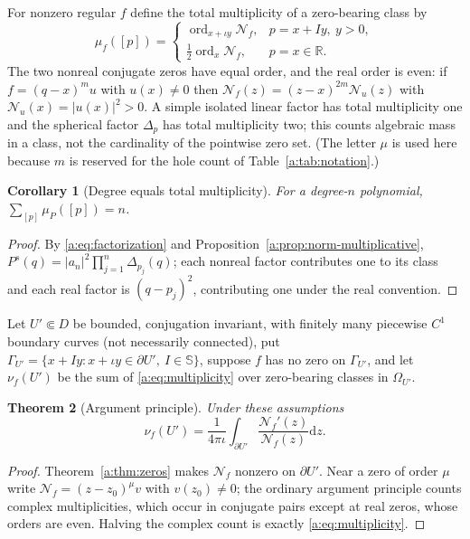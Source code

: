\documentclass[11pt,a4paper]{article}
\numberwithin{equation}{section}
\newtheorem{theorem}{Theorem}[section]
\newtheorem{corollary}[theorem]{Corollary}
\theoremstyle{definition}
\theoremstyle{remark}
\theoremstyle{plain}
\newcommand{\RR}{\mathbb R}
\newcommand{\SSS}{\mathbb S}
\newcommand{\Om}{\Omega}
\newcommand{\abs}[1]{\lvert #1\rvert}
\newcommand{\dd}{\mathrm d}
\begin{document}
For nonzero regular $f$ define the total multiplicity of a zero-bearing class
by
\begin{equation}
 \mu_f([p])=
 \begin{cases}
  \operatorname{ord}_{x+\iota y}\mathcal N_f,&p=x+Iy,\ y>0,\\[2pt]
  \tfrac12\operatorname{ord}_x\mathcal N_f,&p=x\in\RR .
 \end{cases}
 \label{a:eq:multiplicity}
\end{equation}
The two nonreal conjugate zeros have equal order, and the real order is even:
if $f=(q-x)^mu$ with $u(x)\ne0$ then
$\mathcal N_f(z)=(z-x)^{2m}\mathcal N_u(z)$ with
$\mathcal N_u(x)=\abs{u(x)}^2>0$. A simple isolated linear factor has total
multiplicity one and the spherical factor $\Delta_p$ has total multiplicity
two; this counts algebraic mass in a class, not the cardinality of the
pointwise zero set. (The letter $\mu$ is used here because $m$ is reserved
for the hole count of Table~\ref{a:tab:notation}.)

\begin{corollary}[Degree equals total multiplicity]
\label{a:cor:degreecount}
For a degree-$n$ polynomial, $\sum_{[p]}\mu_P([p])=n$.
\end{corollary}

\begin{proof}
By \eqref{a:eq:factorization} and Proposition~\ref{a:prop:norm-multiplicative},
$P^s(q)=\abs{a_n}^2\prod_{j=1}^n\Delta_{p_j}(q)$; each nonreal factor
contributes one to its class and each real factor is $(q-p_j)^2$, contributing
one under the real convention.
\end{proof}

Let $U'\Subset D$ be bounded, conjugation invariant, with finitely many
piecewise $C^1$ boundary curves (not necessarily connected), put
$\Gamma_{U'}=\{x+Iy:x+\iota y\in\partial U',\ I\in\SSS\}$, suppose $f$ has no
zero on $\Gamma_{U'}$, and let $\nu_f(U')$ be the sum of
\eqref{a:eq:multiplicity} over zero-bearing classes in $\Om_{U'}$.

\begin{theorem}[Argument principle]
\label{a:thm:argument}
Under these assumptions
\begin{equation}
 \nu_f(U')=\frac1{4\pi\iota}\int_{\partial U'}
   \frac{\mathcal N_f'(z)}{\mathcal N_f(z)}\dd z .
 \label{a:eq:argument}
\end{equation}
\end{theorem}

\begin{proof}
Theorem~\ref{a:thm:zeros} makes $\mathcal N_f$ nonzero on $\partial U'$. Near a
zero of order $\mu$ write $\mathcal N_f=(z-z_0)^\mu v$ with $v(z_0)\ne0$; the
ordinary argument principle counts complex multiplicities, which occur in
conjugate pairs except at real zeros, whose orders are even. Halving the
complex count is exactly \eqref{a:eq:multiplicity}.
\end{proof}
\end{document}
